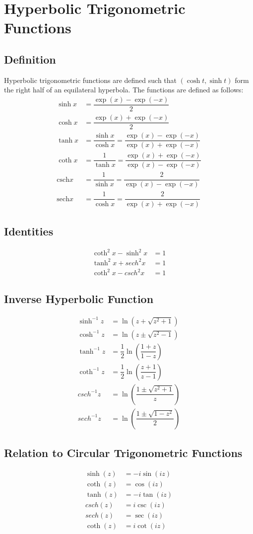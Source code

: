 \documentclass[../main.tex]{subfile}
\begin{document}
    \chapter{Hyperbolic Trigonometric Functions}
    \section{Definition}
    Hyperbolic trigonometric functions are defined such that $(\cosh t,\sinh t)$ form the right half of an equilateral hyperbola. The functions are defined as follows:
    \begin{align}
        \sinh x & = \dfrac{\exp(x) - \exp(-x)}{2}\\
        \cosh x & = \dfrac{\exp(x) + \exp(-x)}{2}\\
        \tanh x & = \dfrac{\sinh x}{\cosh x} = \dfrac{\exp(x) - \exp(-x)}{\exp(x) + \exp(-x)}\\
        \coth x & = \dfrac{1}{\tanh x} = \dfrac{\exp(x) + \exp(-x)}{\exp(x) - \exp(-x)}\\
        \text{csch} x & = \dfrac{1}{\sinh x} = \dfrac{2}{\exp(x) - \exp(-x)}\\
        \text{sech} x & = \dfrac{1}{\cosh x} = \dfrac{2}{\exp(x) + \exp(-x)}
    \end{align}

    \section{Identities}
    \begin{align}
        \coth^2 x - \sinh^2 x & = 1\\
        \tanh^2 x + sech^2 x & = 1\\
        \coth^2 x - csch^2 x & = 1
    \end{align}

    \section{Inverse Hyperbolic Function}
    \begin{align}
        \sinh^{-1} z & = \ln(z + \sqrt{z^2 + 1})\\
        \cosh^{-1} z & = \ln(z \pm \sqrt{z^2 - 1})\\
        \tanh^{-1} z & = \dfrac{1}{2} \ln \left(\dfrac{1 + z}{1 - z} \right)\\
        \coth^{-1} z & = \dfrac{1}{2} \ln \left(\dfrac{z + 1}{z - 1} \right)\\
        csch^{-1} z & = \ln \left( \dfrac{1 \pm \sqrt{z^2 + 1}}{z} \right)\\
        sech^{-1} z & = \ln \left( \dfrac{1 \pm \sqrt{1 - z^2}}{2} \right)
    \end{align}

    \section{Relation to Circular Trigonometric Functions}
    \begin{align}
        \sinh (z) & = -i\sin (iz)\\
        \coth (z) & = \cos (iz)\\
        \tanh (z) & = -i \tan (iz)\\
        csch (z) & = i\csc (iz)\\
        sech (z) & = \sec (iz)\\
        \coth (z) & = i\cot (iz)
    \end{align}
\end{document}

